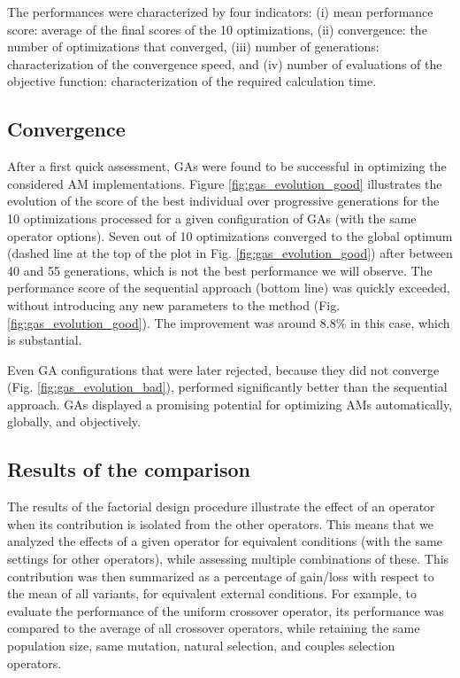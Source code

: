 \documentclass{ametsoc}
\begin{document}
The performances were characterized by four indicators: (i) mean performance score: average of the final scores of the 10 optimizations, (ii) convergence: the number of optimizations that converged, (iii) number of generations: characterization of the convergence speed, and (iv) number of evaluations of the objective function: characterization of the required calculation time.


\subsection{Convergence}

After a first quick assessment, GAs were found to be successful in optimizing the considered AM implementations. Figure \ref{fig:gas_evolution_good} illustrates the evolution of the score of the best individual over progressive generations for the 10 optimizations processed for a given configuration of GAs (with the same operator options). Seven out of 10 optimizations converged to the global optimum (dashed line at the top of the plot in Fig. \ref{fig:gas_evolution_good}) after between 40 and 55 generations, which is not the best performance we will observe. The performance score of the sequential approach (bottom line) was quickly exceeded, without introducing any new parameters to the method (Fig. \ref{fig:gas_evolution_good}). The improvement was around 8.8\% in this case, which is substantial.

Even GA configurations that were later rejected, because they did not converge (Fig. \ref{fig:gas_evolution_bad}), performed significantly better than the sequential approach. GAs displayed a promising potential for optimizing AMs automatically, globally, and objectively.


\subsection{Results of the comparison}
\label{sec:assessment:results}

The results of the factorial design procedure illustrate the effect of an operator when its contribution is isolated from the other operators. This means that we analyzed the effects of a given operator for equivalent conditions (with the same settings for other operators), while assessing multiple combinations of these. This contribution was then summarized as a percentage of gain/loss with respect to the mean of all variants, for equivalent external conditions. For example, to evaluate the performance of the uniform crossover operator, its performance was compared to the average of all crossover operators, while retaining the same population size, same mutation, natural selection, and couples selection operators.
\end{document}
